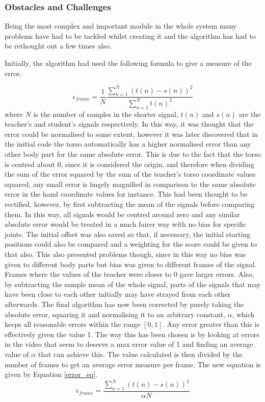 \documentclass[11pt,a4paper]{article}
\begin{document}
\noindent

\subsubsection{Obstacles and Challenges}
\label{sec:obstacles}

\noindent
Being the most complex and important module in the whole system many problems have had to be tackled whilst creating it and the algorithm has had to be rethought out a few times also. 

\noindent
Initially, the algorithm had used the following formula to give a measure of the error.

\begin{equation}
\epsilon_{frame} = \frac{1}{N} \dfrac{\sum\limits_{n=1}^{N}(t(n)-s(n))^2}{\sum\limits_{n=1}^{N}t(n)^2}
\end{equation}
where $N$ is the number of samples in the shorter signal, $t(n)$ and $s(n)$ are the teacher's and student's signals respectively. In this way, it was thought that the error could be normalised to some extent, however it was later discovered that in the initial code the torso automatically has a higher normalised error than any other body part for the same absolute error. This is due to the fact that the torso is centred about 0, since it is considered the origin, and therefore when dividing the sum of the error squared by the sum of the teacher's torso coordinate values squared, any small error is hugely magnified in comparison to the same absolute error in the hand coordinate values for instance. This had been thought to be rectified, however, by first subtracting the mean of the signals before comparing them. In this way, all signals would be centred around zero and any similar absolute error would be treated in a much fairer way with no bias for specific joints. The initial offset was also saved so that, if necessary, the initial starting positions could also be compared and a weighting for the score could be given to that also. This also presented problems though, since in this way no bias was given to different body parts but bias was given to different frames of the signal. Frames where the values of the teacher were closer to 0 gave larger errors. Also, by subtracting the sample mean of the whole signal, parts of the signals that may have been close to each other initially may have strayed from each other afterwards. The final algorithm has now been corrected by purely taking the absolute error, squaring it and normalising it to an arbitrary constant, $\alpha$, which keeps all reasonable errors within the range $[0, 1]$. Any error greater than this is effectively given the value 1. The way this has been chosen is by looking at errors in the video that seem to deserve a max error value of 1 and finding an average value of $\alpha$ that can achieve this. The value calculated is then divided by the number of frames to get an average error measure per frame. The new equation is given by Equation \eqref{error_eq}.
\begin{equation}
\epsilon_{frame} = \dfrac{\sum\limits_{n=1}^{N}(t(n)-s(n))^2}{\alpha N}
\label{error_eq}
\end{equation}
 
\end{document}

